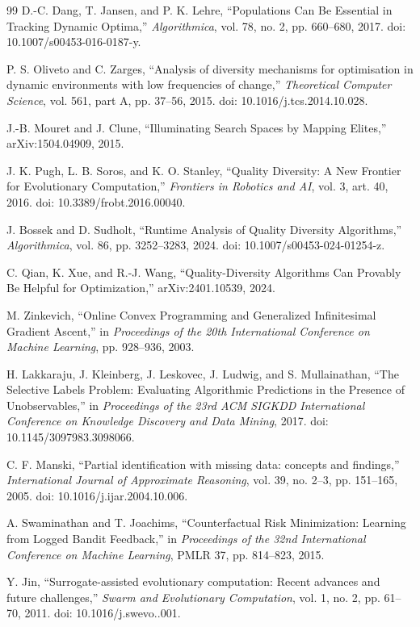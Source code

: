 \documentclass[11pt]{article}
\begin{document}
\begin{thebibliography}{99}
D.-C. Dang, T. Jansen, and P. K. Lehre,
``Populations Can Be Essential in Tracking Dynamic Optima,''
\emph{Algorithmica}, vol. 78, no. 2, pp. 660--680, 2017.
doi: 10.1007/s00453-016-0187-y.

P. S. Oliveto and C. Zarges,
``Analysis of diversity mechanisms for optimisation in dynamic environments with low frequencies of change,''
\emph{Theoretical Computer Science}, vol. 561, part A, pp. 37--56, 2015.
doi: 10.1016/j.tcs.2014.10.028.

J.-B. Mouret and J. Clune,
``Illuminating Search Spaces by Mapping Elites,''
arXiv:1504.04909, 2015.

J. K. Pugh, L. B. Soros, and K. O. Stanley,
``Quality Diversity: A New Frontier for Evolutionary Computation,''
\emph{Frontiers in Robotics and AI}, vol. 3, art. 40, 2016.
doi: 10.3389/frobt.2016.00040.

J. Bossek and D. Sudholt,
``Runtime Analysis of Quality Diversity Algorithms,''
\emph{Algorithmica}, vol. 86, pp. 3252--3283, 2024.
doi: 10.1007/s00453-024-01254-z.

C. Qian, K. Xue, and R.-J. Wang,
``Quality-Diversity Algorithms Can Provably Be Helpful for Optimization,''
arXiv:2401.10539, 2024.

M. Zinkevich,
``Online Convex Programming and Generalized Infinitesimal Gradient Ascent,''
in \emph{Proceedings of the 20th International Conference on Machine Learning},
pp. 928--936, 2003.

H. Lakkaraju, J. Kleinberg, J. Leskovec, J. Ludwig, and S. Mullainathan,
``The Selective Labels Problem: Evaluating Algorithmic Predictions in the
Presence of Unobservables,'' in \emph{Proceedings of the 23rd ACM SIGKDD
International Conference on Knowledge Discovery and Data Mining}, 2017.
doi: 10.1145/3097983.3098066.

C. F. Manski,
``Partial identification with missing data: concepts and findings,''
\emph{International Journal of Approximate Reasoning}, vol. 39, no. 2--3,
pp. 151--165, 2005.
doi: 10.1016/j.ijar.2004.10.006.

A. Swaminathan and T. Joachims,
``Counterfactual Risk Minimization: Learning from Logged Bandit Feedback,''
in \emph{Proceedings of the 32nd International Conference on Machine
Learning}, PMLR 37, pp. 814--823, 2015.

Y. Jin,
``Surrogate-assisted evolutionary computation: Recent advances and future
challenges,'' \emph{Swarm and Evolutionary Computation}, vol. 1, no. 2,
pp. 61--70, 2011.
doi: 10.1016/j.swevo..001.
\end{thebibliography}
\end{document}

